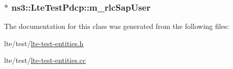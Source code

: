 \subsubsection[{\texorpdfstring{m\+\_\+rlc\+Sap\+User}{m_rlcSapUser}}]{$\ast$ ns3\+::\+Lte\+Test\+Pdcp\+::m\+\_\+rlc\+Sap\+User\hspace{0.3cm}{\ttfamily [private]}}\hypertarget{classns3_1_1LteTestPdcp_a76903da159d3fa267cb9c06c112190a7}{}\label{classns3_1_1LteTestPdcp_a76903da159d3fa267cb9c06c112190a7}


The documentation for this class was generated from the following files\+:\begin{DoxyCompactItemize}
\item 
lte/test/\hyperlink{lte-test-entities_8h}{lte-\/test-\/entities.\+h}\item 
lte/test/\hyperlink{lte-test-entities_8cc}{lte-\/test-\/entities.\+cc}\end{DoxyCompactItemize}
